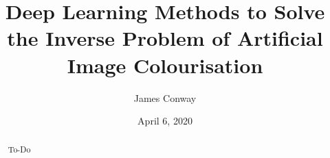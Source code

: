 \documentclass{l4proj}
\begin{document}
\title{Deep Learning Methods to Solve the Inverse Problem of Artificial Image Colourisation}
\author{James Conway}
\date{April 6, 2020}

\maketitle


\begin{abstract}
    To-Do
\end{abstract}


%
%
\def\consentname {James Conway} %
\def\consentdate {6 April 2020} %
%
\educationalconsent


\tableofcontents
\end{document}
